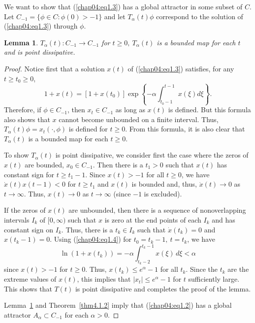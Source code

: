 \documentclass{surv-l}
\theoremstyle{plain}
\newtheorem{lemma}[theorem]{Lemma}
\theoremstyle{definition}
\numberwithin{equation}{section}
\numberwithin{figure}{chapter}
\begin{document}
We want to show that (\ref{chap04:eq1.3}) has a global attractor in some subset of $C$. Let $C_{-1}=\{\phi\in C\!:\phi(0)>-1\}$ and let $ T_{\alpha}(t)\phi$ correspond to the solution of (\ref{chap04:eq1.3}) through $\phi$.

\begin{lemma}\label{lem4.1.3}
$T_{\alpha}(t)\!:C_{-1}\rightarrow C_{-1}$ for $t\geq 0,\ T_{\alpha}(t)$ is a bounded map for each $t$ and is point dissipative.
\end{lemma}

\begin{proof}
Notice first that a solution $x(t)$ of (\ref{chap04:eq1.3}) satisfies, for any $t\geq t_{0}\geq 0$,
\begin{equation}\label{chap04:eq1.4}
1+x(t)=[1+x(t_{0})]\exp\left\{-\alpha\int_{t_{0}-1}^{t-1}x(\xi)d\xi\right\}.
\end{equation}
Therefore, if $\phi\in C_{-1}$, then $x_{t}\in C_{-1}$ as long as $x(t)$ is defined. But this formula also shows that $x$ cannot become unbounded on a finite interval. Thus, $T_{\alpha}(t)\phi=x_{t}(\cdot, \phi)$ is defined for $t\geq 0$. From this formula, it is also clear that $T_{\alpha}(t)$ is a bounded map for each $t\geq 0$.

To show $T_{\alpha}(t)$ is point dissipative, we consider first the case where the zeros of $x(t)$ are bounded, $x_{0}\in C_{-1}$. Then there is a $t_{1}>0$ such that $x(t)$ has constant sign for $t\geq t_{1}-1$. Since $x(t)>-1$ for all $t\geq 0$, we have $\dot{x}(t)x(t-1)<0$ for $t\geq t_{1}$ and $x(t)$ is bounded and, thus, $\dot{x}(t)\rightarrow 0$ as $ t\rightarrow\infty$. Thus, $x(t)\rightarrow 0$ as $ t\rightarrow\infty$ (since $-1$ is excluded).

If the zeros of $x(t)$ are unbounded, then there is a sequence of nonoverlapping intervals $I_{k}$ of $[0, \infty)$ such that $x$ is zero at the end points of each $I_{k}$ and has constant sign on $I_{k}$. Thus, there is a $t_{k}\in I_{k}$ such that $\dot{x}(t_{k})=0$ and $x(t_{k}-1)=0$. Using (\ref{chap04:eq1.4}) for $t_{0}=t_{k}-1,\ t=t_{k}$, we have
\begin{equation*}
\ln(1+x(t_{k}))=-\alpha\displaystyle\int_{t_{k}-2}^{t_{k}-1}x(\xi)\,d\xi<\alpha
\end{equation*}
since $x(t)>-1$ for $t\geq 0$. Thus, $x(t_{k})\leq e^{\alpha}-1$ for all $t_{k}$. Since the $t_{k}$ are the extreme values of $x(t)$, this implies that $|x_{t}|\leq e^{\alpha}-1$ for $t$ sufficiently large. This shows that $T(t)$ is point dissipative and completes the proof of the lemma.

Lemma~\ref{lem4.1.3} and Theorem~\ref{thm4.1.2} imply that (\ref{chap04:eq1.2}) has a global attractor $ A_{\alpha}\subset C_{-1}$ for each $\alpha>0$.
\end{proof}
\end{document}
